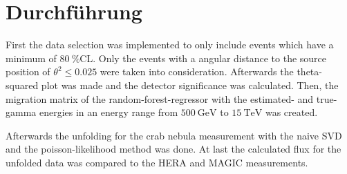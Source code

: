\section{Durchführung}
\label{sec:durch}
First the data selection was implemented to only include events which have a minimum of $\SI{80}{\percent}$CL.
Only the events with a angular distance to the source position of $\theta^2 \leq \num{0.025}$ were taken into consideration.
Afterwards the theta-squared plot was made and the detector significance was calculated.
Then, the migration matrix of the random-forest-regressor with the estimated- and true-gamma energies in an energy range from $\SI{500}{\giga\electronvolt}$ to $\SI{15}{\tera\electronvolt}$ was created.

Afterwards the unfolding for the crab nebula measurement with the naive SVD and the poisson-likelihood method was done.
At last the calculated flux for the unfolded data was compared to the HERA and MAGIC measurements.
